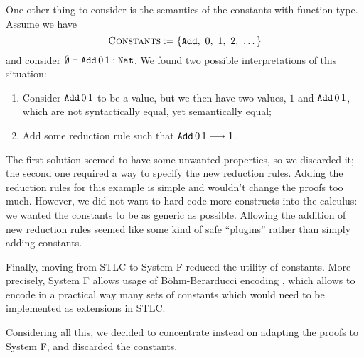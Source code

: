 \noindent
One other thing to consider is the semantics of the constants with function type.
Assume we have 
\[\textsc{Constants} := \left\{ \texttt{Add},\ 0,\ 1,\ 2,\ \ldots{} \right\}\]
and consider $\emptyset{} \vdash{} {\ensuremath{{\texttt{Add}}\,{0}}}\,{1} : {\texttt{Nat}}$.
We found two possible interpretations of this situation:
\begin{enumerate}
    \item Consider ${{\texttt{Add}}\,{0}}\,{1}$ to be a value, but we then have two values, $1$ and ${{\texttt{Add}}\,{0}}\,{1}$, which are not syntactically equal, yet semantically equal;
    \item Add some reduction rule such that ${{\texttt{Add}}\,{0}}\,{1} \longrightarrow{}{} 1$.
\end{enumerate}
The first solution seemed to have some unwanted properties, so we discarded it; 
the second one required a way to specify the new reduction rules.
Adding the reduction rules for this example is simple and wouldn't change the proofs too much.
However, we did not want to hard-code more constructs into the calculus:
we wanted the constants to be as generic as possible.
Allowing the addition of new reduction rules seemed like some kind of safe 
``plugins'' rather than simply adding constants.

Finally, moving from STLC to System F reduced the utility of constants.
More precisely, System F allows usage of Böhm-Berarducci encoding \cite{bbencodingArt, bbencodingBlog},
which allows to encode in a practical way many sets of constants which would need to be implemented as extensions in STLC.

Considering all this, we decided to concentrate instead on adapting the proofs to System F, and discarded the constants.

